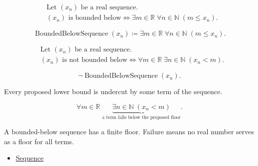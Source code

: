 \begin{remark*}
\[
\begin{aligned}
&\text{Let } (x_n) \text{ be a real sequence.}\\
&(x_n) \text{ is bounded below}
\Longleftrightarrow
\exists m \in \mathbb{R}\;
\forall n \in \mathbb{N}\;(m \le x_n).
\end{aligned}
\]
\end{remark*}

\begin{remark*}
\[
\operatorname{BoundedBelowSequence}(x_n)
\coloneqq
\exists m \in \mathbb{R}\;
\forall n \in \mathbb{N}\;(m \le x_n).
\]
\end{remark*}

\begin{remark*}
\[
\begin{aligned}
&\text{Let } (x_n) \text{ be a real sequence.}\\
&(x_n) \text{ is not bounded below}
\Longleftrightarrow
\forall m \in \mathbb{R}\;
\exists n \in \mathbb{N}\;(x_n < m).
\end{aligned}
\]
\end{remark*}

\begin{remark*}
\[
\neg\operatorname{BoundedBelowSequence}(x_n).
\]
\end{remark*}

\begin{remark*}
Every proposed lower bound is undercut by some term of the sequence.
\end{remark*}

\begin{remark*}
\[
\forall m \in \mathbb{R}\;
\underbrace{\exists n \in \mathbb{N}\;(x_n < m)}
_{\text{a term falls below the proposed floor}}.
\]
\end{remark*}

\begin{remark*}[Interpretation]
A bounded-below sequence has a finite floor. Failure means no real number
serves as a floor for all terms.
\end{remark*}

\begin{dependencies}
\begin{itemize}
  \item \hyperref[def:sequence]{Sequence}
\end{itemize}
\end{dependencies}

